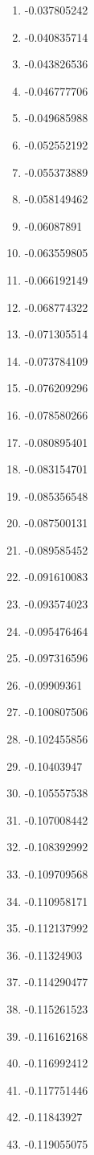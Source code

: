 \documentclass[6pt]{article}
\begin{document}
\begin{multicols}{4}
\begin{enumerate}
		\item -0.037805242
		\item -0.040835714
		\item -0.043826536
		\item -0.046777706
		\item -0.049685988
		\item -0.052552192
		\item -0.055373889
		\item -0.058149462
		\item -0.06087891
		\item -0.063559805
		\item -0.066192149
		\item -0.068774322
		\item -0.071305514
		\item -0.073784109
		\item -0.076209296
		\item -0.078580266
		\item -0.080895401
		\item -0.083154701
		\item -0.085356548
		\item -0.087500131
		\item -0.089585452
		\item -0.091610083
		\item -0.093574023
		\item -0.095476464
		\item -0.097316596
		\item -0.09909361
		\item -0.100807506
		\item -0.102455856
		\item -0.10403947
		\item -0.105557538
		\item -0.107008442
		\item -0.108392992
		\item -0.109709568
		\item -0.110958171
		\item -0.112137992
		\item -0.11324903
		\item -0.114290477
		\item -0.115261523
		\item -0.116162168
		\item -0.116992412
		\item -0.117751446
		\item -0.11843927
		\item -0.119055075

\end{enumerate}
\end{multicols}
\end{document}
